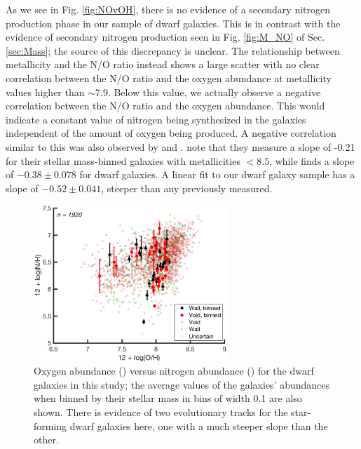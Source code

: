 As we see in Fig. \ref{fig:NOvOH}, there is no evidence of a secondary nitrogen 
production phase in our sample of dwarf galaxies.  This is in contrast with the 
evidence of secondary nitrogen production seen in Fig. \ref{fig:M_NO} of Sec. 
\ref{sec:Mass}; the source of this discrepancy is unclear.  The relationship 
between metallicity and the N/O ratio instead shows a large scatter with no 
clear correlation between the N/O ratio and the oxygen abundance at metallicity 
values higher than $\sim$7.9.  Below this value, we actually observe a negative 
correlation between the N/O ratio and the oxygen abundance.  This would indicate 
a constant value of nitrogen being synthesized in the galaxies independent of 
the amount of oxygen being produced.  A negative correlation similar to this was 
also observed by \cite{Andrews13} and \cite{Douglass17b}.   \cite{Andrews13} 
note that they measure a slope of -0.21 for their stellar mass-binned galaxies 
with metallicities \OH $< 8.5$, while \cite{Douglass17b} finds a slope of 
$-0.38\pm 0.078$ for dwarf galaxies.  A linear fit to our dwarf galaxy sample 
has a slope of $-0.52\pm 0.041$, steeper than any previously measured.

\begin{figure}
    \includegraphics[width=0.65\textwidth]{Images/Paper3/1sig_I06relations_dwarf_SF_t3_dust_NSA_Z12logOH_N12logNH_scatterMbin}
    \caption[O/H versus N/H for star-forming dwarf galaxies]{Oxygen abundance 
    (\OH) versus nitrogen abundance (\NH) for the dwarf galaxies in this study; 
    the average values of the galaxies' abundances when binned by their stellar 
    mass in bins of width 0.1 are also shown.  There is evidence of two 
    evolutionary tracks for the star-forming dwarf galaxies here, one with a 
    much steeper slope than the other.}
    \label{fig:OvN_P3}
\end{figure}

